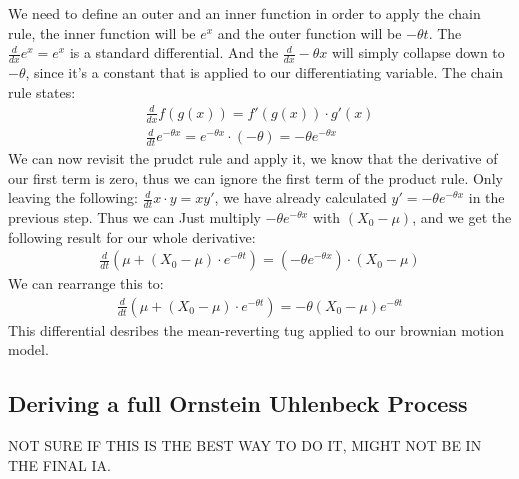 \documentclass{article}
\begin{document}
\begin{spacing}{2.0}
We need to define an outer and an inner function in order to apply the chain rule, the inner function will be $e^{x}$ and the outer function will be $-\theta t$.
The $\frac{d}{dx}e^{x} = e^{x}$ is a standard differential. And the $\frac{d}{dx} -\theta x$ will simply collapse down to $-\theta$, since it's a constant that is
applied to our differentiating variable. The chain rule states:
\begin{gather*}
    \frac{d}{dx} f(g(x)) = f'(g(x)) \cdot g'(x) \\
    \frac{d}{dt} e^{-\theta x} = e^{-\theta x} \cdot (-\theta) = -\theta e^{-\theta x}
\end{gather*}
We can now revisit the prudct rule and apply it, we know that the derivative of our first term is zero, thus we can ignore the first term of the product rule.
Only leaving the following: $\frac{d}{dt}x \cdot y = xy'$, we have already calculated $y' = -\theta e^{-\theta x}$ in the previous step. Thus we can Just
multiply $-\theta e^{-\theta x}$ with $(X_{0} - \mu)$, and we get the following result for our whole derivative:
\begin{gather*}
    \frac{d}{dt} \left ( \mu + \left ( X_{0} - \mu \right ) \cdot e^{-\theta t} \right ) = (-\theta e^{-\theta x}) \cdot (X_{0} - \mu)
\end{gather*}
We can rearrange this to:
\begin{gather*}
    \frac{d}{dt} \left ( \mu + \left ( X_{0} - \mu \right ) \cdot e^{-\theta t} \right ) = -\theta (X_{0} - \mu) e^{-\theta t}
\end{gather*}
This differential desribes the mean-reverting tug applied to our brownian motion model.

\subsection{Deriving a full Ornstein Uhlenbeck Process}

NOT SURE IF THIS IS THE BEST WAY TO DO IT, MIGHT NOT BE IN THE FINAL IA.


\end{spacing}
\end{document}
